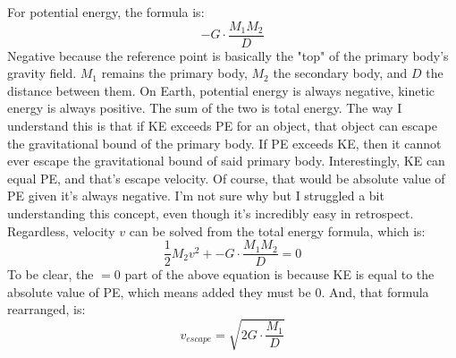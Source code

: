 \documentclass[12pt]{article}
\begin{document}
For potential energy, the formula is:
$$- G \cdot \frac{M_1 M_2}{D}$$
Negative because the reference point is basically the "top" of the primary body's gravity field. $M_1$ remains the primary body, $M_2$ the secondary body, and $D$ the distance
between them. On Earth, potential energy is always negative, kinetic energy is always positive. The sum of the two is total energy. The way I understand this is that if 
KE exceeds PE for an object, that object can escape the gravitational bound of the primary body. If PE exceeds KE, then it cannot ever escape the gravitational
bound of said primary body. Interestingly, KE can equal PE, and that's escape velocity. Of course, that would be absolute value of PE given it's always negative.
I'm not sure why but I struggled a bit understanding this concept, even though it's incredibly easy in retrospect. 
Regardless, velocity $v$ can be solved from the total energy formula, which is: $$\frac{1}{2}M_2v^2 + - G \cdot \frac{M_1 M_2}{D} = 0$$
To be clear, the $= 0$ part of the above equation is because KE is equal to the absolute value of PE, which means added they must be 0. And, that formula rearranged, is:
$$v_{escape} = \sqrt{2G \cdot \frac{M_1}{D}}$$
\end{document}
